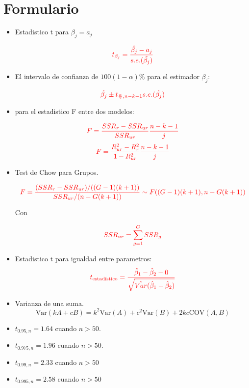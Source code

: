 \documentclass[10pt,a4paper]{article}
\begin{document}
\section*{Formulario}
\begin{itemize}

\item Estadistico t para $\beta_j = a_j$

$$\color{red}{t_{\beta_j}=\frac{\hat{\beta_j}-a_j}{s.e.(\hat{\beta_j})}}$$

\item El intervalo de confianza de $100(1-\alpha)\%$ para el estimador $\beta_j$:

$${\color{red}\hat{\beta_j} \pm t_{\frac{\alpha}{2},n-k-1}s.e.(\hat{\beta_j})}$$


\item para el estadistico F entre dos modelos:

$$\color{red}{F=\frac{SSR_r-SSR_{ur}}{SSR_{ur}}\frac{n-k-1}{j}}$$
$$\color{red}{F=\frac{R^2_{ur}-R^2_{r}}{1-R^2_{ur}}\frac{n-k-1}{j}}$$

\item Test de Chow para Grupos.

    \[\color{red}
    F = \frac{(SSR_r - SSR_{ur}) / ((G - 1)(k + 1))}{SSR_{ur} / (n - G(k + 1))} \sim F((G - 1)(k + 1), n - G(k + 1))
    \]

Con

$$\color{red}SSR_{ur} = \sum_{g=1}^G SSR_g$$

\item Estadistico t para igualdad entre parametros:
 \[\color{red}t_{\text{estadístico}} = \frac{\hat{\beta}_1 - \hat{\beta}_2 - 0}{\sqrt{\hat{Var}(\hat{\beta}_1 - \hat{\beta}_2)}}\]


\item  Varianza de una suma.
{\color{red}
$$\text{Var}(kA + cB) = k^2\text{Var}(A) + c^2\text{Var}(B) + 2kc\text{COV}(A, B)$$}

\item $t_{0.95,n} = 1.64$ cuando $n >50$.
\item $t_{0.975,n} = 1.96$ cuando $n >50$.
\item $t_{0.99,n}=2.33$ cuando $n>50$
\item $t_{0.995,n}=2.58$ cuando $n>50$



\end{itemize}
\end{document}
